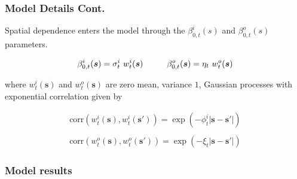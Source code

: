 \documentclass[t]{beamer}\usepackage[]{graphicx}\usepackage[]{color}
\begin{document}

\begin{frame}
\frametitle{Model Details Cont.}

Spatial dependence enters the model through the $\beta_{0,t}^i(s)$ and $\beta_{0,t}^o(s)$ parameters.


\[ \beta_{0,t}^i(\bm{s}) = {\sigma}^i_t~w^i_t(\bm{s}) 
\hspace{10mm}
\beta_{0,t}^o(\bm{s}) = {\eta}_t~w^o_t(\bm{s}) \]

\vspace{5mm}

where $w^i_{t}(\bm{s})$ and $w^o_{t}(\bm{s})$ are zero mean, variance $1$, Gaussian processes with exponential correlation given by 


\begin{align*}
\text{corr}(w^i_{t}(\bm{s}),w^i_{t}(\bm{s}')) = \exp(-\phi^i_{t} |\bm{s}-\bm{s}'|) \\
\\
\text{corr}(w^o_{t}(\bm{s}),w^o_{t}(\bm{s}')) = \exp(-\xi_{t} |\bm{s}-\bm{s}'|)
\end{align*}


\end{frame}


\begin{frame}[label=pm_results]
\frametitle{Model results}

\vfill
\begin{center}
\end{center}
\vfill


\end{frame}
\end{document}
